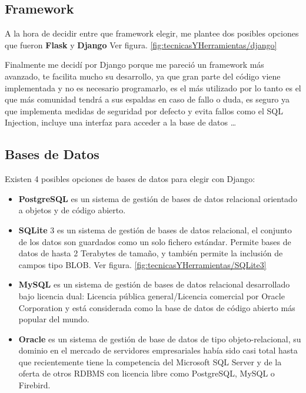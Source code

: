 \newpage
\subsection{Framework}

A la hora de decidir entre que framework elegir, me plantee dos posibles opciones que fueron \textbf{Flask} \cite{Flask} y \textbf{Django} \cite{Django} Ver figura. \ref{fig:tecnicasYHerramientas/django}

Finalmente me decidí por Django porque me pareció un framework más avanzado, te facilita mucho su desarrollo, ya que gran parte del código viene implementada y no es necesario programarlo, es el más utilizado por lo tanto es el que más comunidad tendrá a sus espaldas en caso de fallo o duda, es seguro ya que implementa medidas de seguridad por defecto y evita fallos como el SQL Injection, incluye una interfaz para acceder a la base de datos \ldots


\subsection{Bases de Datos}

Existen 4 posibles opciones de bases de datos para elegir con Django:
	\begin{itemize}
	\item \textbf{PostgreSQL} \cite{PostgreSQL} es un sistema de gestión de bases de datos relacional orientado a objetos y de código abierto. 
	\item \textbf{SQLite} 3 \cite{SQLite3} es un sistema de gestión de bases de datos relacional, el conjunto de los datos son guardados como un solo fichero estándar. Permite bases de datos de hasta 2 Terabytes de tamaño, y también permite la inclusión de campos tipo BLOB. Ver figura. \ref{fig:tecnicasYHerramientas/SQLite3}
	\item \textbf{MySQL} \cite{MySQL} es un sistema de gestión de bases de datos relacional desarrollado bajo licencia dual: Licencia pública general/Licencia comercial por Oracle Corporation y está considerada como la base de datos de código abierto más popular del mundo.
	\item \textbf{Oracle} \cite{Oracle} es un sistema de gestión de base de datos de tipo objeto-relacional, su dominio en el mercado de servidores empresariales había sido casi total hasta que recientemente tiene la competencia del Microsoft SQL Server y de la oferta de otros RDBMS con licencia libre como PostgreSQL, MySQL o Firebird.
	\end{itemize}

